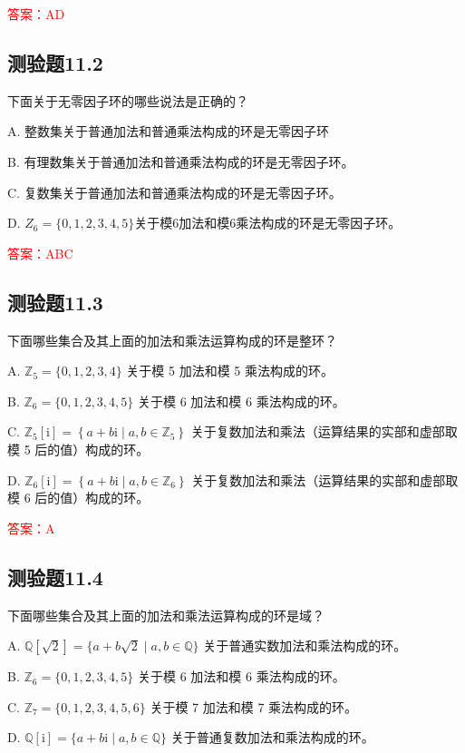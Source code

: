 \documentclass[UTF8, heading=true]{ctexart}
\begin{document}
\textcolor{red}{答案：AD}

\subsection{测验题11.2}

下面关于无零因子环的哪些说法是正确的？

A. 整数集关于普通加法和普通乘法构成的环是无零因子环

B. 有理数集关于普通加法和普通乘法构成的环是无零因子环。

C. 复数集关于普通加法和普通乘法构成的环是无零因子环。

D. $Z_6=\{0, 1,2,3,4,5\}$关于模6加法和模6乘法构成的环是无零因子环。

\textcolor{red}{答案：ABC}

\subsection{测验题11.3}

下面哪些集合及其上面的加法和乘法运算构成的环是整环？

A. $\mathbb{Z}_5=\{0,1,2,3,4\}$ 关于模 5 加法和模 5 乘法构成的环。

B. $\mathbb{Z}_6=\{0,1,2,3,4,5\}$ 关于模 6 加法和模 6 乘法构成的环。

C. $\mathbb{Z}_5[\mathrm{i}]=\left\{a+b \mathrm{i} \mid a, b \in \mathbb{Z}_5\right\}$ 关于复数加法和乘法（运算结果的实部和虚部取模 5 后的值）构成的环。

D. $\mathbb{Z}_6[\mathrm{i}]=\left\{a+b \mathrm{i} \mid a, b \in \mathbb{Z}_6\right\}$ 关于复数加法和乘法（运算结果的实部和虚部取模 6 后的值）构成的环。

\textcolor{red}{答案：A}

\subsection{测验题11.4}

下面哪些集合及其上面的加法和乘法运算构成的环是域？

A. $\mathbb{Q}[\sqrt{2}]=\{a+b \sqrt{2} \mid a, b \in \mathbb{Q}\}$ 关于普通实数加法和乘法构成的环。

B. $\mathbb{Z}_6=\{0,1,2,3,4,5\}$ 关于模 6 加法和模 6 乘法构成的环。

C. $\mathbb{Z}_7=\{0,1,2,3,4,5,6\}$ 关于模 7 加法和模 7 乘法构成的环。

D. $\mathbb{Q}[\mathrm{i}]=\{a+b \mathrm{i} \mid a, b \in \mathbb{Q}\}$ 关于普通复数加法和乘法构成的环。
\end{document}
